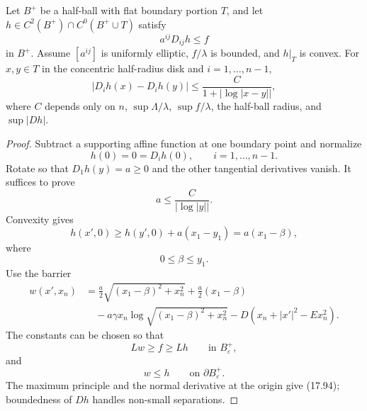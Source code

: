 \begin{lemma}
\label{gt-ch17-lem-logarithmic-boundary-modulus-convex-traces}
Let $B^+$ be a half-ball with flat boundary portion $T$, and let
$h\in C^2(B^+)\cap C^0(B^+\cup T)$ satisfy
\begin{equation}\tag{17.91}
a^{ij}D_{ij}h\le f
\end{equation}
in $B^+$.  Assume $[a^{ij}]$ is uniformly elliptic, $f/\lambda$ is bounded,
and $h|_T$ is convex.  For $x,y\in T$ in the concentric half-radius disk and
$i=1,\ldots,n-1$,
\begin{equation}\tag{17.92}
|D_ih(x)-D_ih(y)|\le\frac{C}{1+|\log|x-y||},
\end{equation}
where $C$ depends only on $n$, $\sup\Lambda/\lambda$,
$\sup f/\lambda$, the half-ball radius, and $\sup|Dh|$.
\end{lemma}
\begin{proof}
\sketch Subtract a supporting affine function at one boundary point and
normalize
\begin{equation}
\tag{17.93}
h(0)=0=D_ih(0),\qquad i=1,\ldots,n-1.
\end{equation}
Rotate so that $D_1h(y)=a\geq0$ and the other tangential derivatives vanish.
It suffices to prove
\begin{equation}
\tag{17.94}
a\leq\frac C{|\log|y||}.
\end{equation}
Convexity gives
\begin{equation}
\tag{17.95}
h(x',0)\geq h(y',0)+a(x_1-y_1)=a(x_1-\beta),
\end{equation}
where
\begin{equation}
\tag{17.96}
0\leq\beta\leq y_1.
\end{equation}
Use the barrier
\begin{equation}
\tag{17.97}
\begin{aligned}
w(x',x_n)&=\frac a2\sqrt{(x_1-\beta)^2+x_n^2}
+\frac a2(x_1-\beta)\\
&\quad-a\gamma x_n\log\sqrt{(x_1-\beta)^2+x_n^2}
-D(x_n+|x'|^2-Ex_n^2).
\end{aligned}
\end{equation}
The constants can be chosen so that
\begin{equation}
\tag{17.98}
Lw\geq f\geq Lh\qquad\text{in }B_\varepsilon^+,
\end{equation}
and
\begin{equation}
\tag{17.99}
w\leq h\qquad\text{on }\partial B_\varepsilon^+.
\end{equation}
The maximum principle and the normal derivative at the origin give (17.94);
boundedness of $Dh$ handles non-small separations.
\end{proof}

